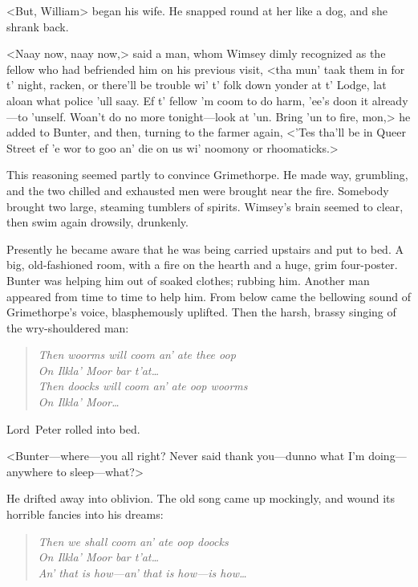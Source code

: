 <But, William\longdash> began his wife. He snapped round at her like a dog, and she shrank back.

<Naay now, naay now,> said a man, whom Wimsey dimly recognized as the fellow who had befriended him on his previous visit, <tha mun' taak them in for t' night, racken, or there'll be trouble wi' t' folk down yonder at t' Lodge, lat aloan what police 'ull saay. Ef t' fellow 'm coom to do harm, 'ee's doon it already—to 'unself. Woan't do no more tonight—look at 'un. Bring 'un to fire, mon,> he added to Bunter, and then, turning to the farmer again, <'Tes tha'll be in Queer Street ef 'e wor to goo an' die on us wi' noomony or rhoomaticks.>

This reasoning seemed partly to convince Grimethorpe. He made way, grumbling, and the two chilled and exhausted men were brought near the fire. Somebody brought two large, steaming tumblers of spirits.  Wimsey's brain seemed to clear, then swim again drowsily, drunkenly. 

\divider

Presently he became aware that he was being carried upstairs and put to bed. A big, old-fashioned room, with a fire on the hearth and a huge, grim four-poster. Bunter was helping him out of soaked clothes; rubbing him. Another man appeared from time to time to help him. From below came the bellowing sound of Grimethorpe's voice, blasphemously uplifted. Then the harsh, brassy singing of the wry-shouldered man: 



\begin{quote}\itshape
Then woorms will coom an' ate thee oop\\
On Ilkla' Moor bar t'at\dots\\
Then doocks will coom an' ate oop woorms\\
On Ilkla' Moor\dots\\
\end{quote}


Lord~Peter rolled into bed.

<Bunter—where—you all right? Never said thank you—dunno what I'm doing—anywhere to sleep—what?>

He drifted away into oblivion. The old song came up mockingly, and wound its horrible fancies into his dreams: 

\begin{quote}\itshape
Then we shall coom an' ate oop doocks\\
On Ilkla' Moor bar t'at\dots\\
An' that is how—{\small an' that is how—}{\footnotesize is how\dots}\\
\end{quote}


